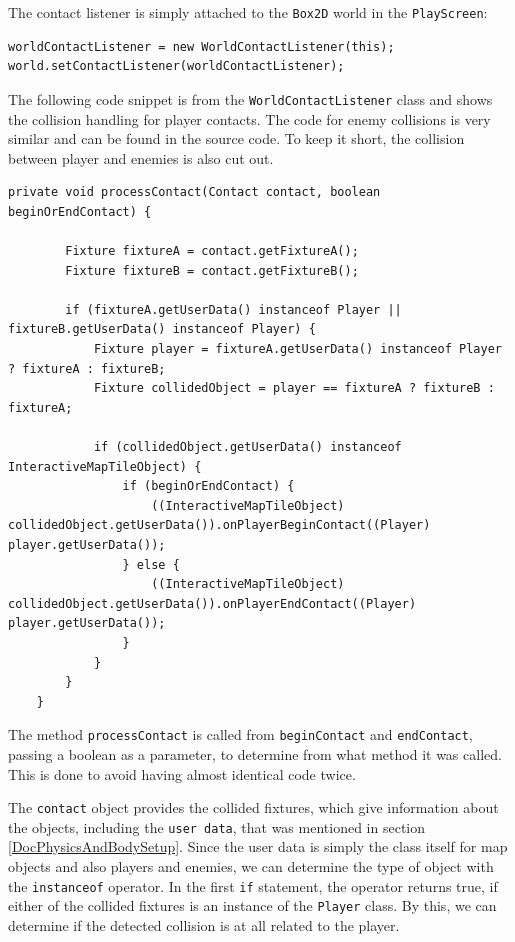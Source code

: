 \documentclass[12p]{article}
\begin{document}
The contact listener is simply attached to the \texttt{Box2D} world in the \texttt{PlayScreen}:

\begin{verbatim}
worldContactListener = new WorldContactListener(this);
world.setContactListener(worldContactListener);
\end{verbatim}

The following code snippet is from the \texttt{WorldContactListener} class and shows the collision handling for player contacts. The code for enemy collisions is very similar and can be found in the source code. To keep it short, the collision between player and enemies is also cut out.

\begin{verbatim}
private void processContact(Contact contact, boolean beginOrEndContact) {

        Fixture fixtureA = contact.getFixtureA();
        Fixture fixtureB = contact.getFixtureB();

        if (fixtureA.getUserData() instanceof Player || fixtureB.getUserData() instanceof Player) {
            Fixture player = fixtureA.getUserData() instanceof Player ? fixtureA : fixtureB;
            Fixture collidedObject = player == fixtureA ? fixtureB : fixtureA;

            if (collidedObject.getUserData() instanceof InteractiveMapTileObject) {
                if (beginOrEndContact) {
                    ((InteractiveMapTileObject) collidedObject.getUserData()).onPlayerBeginContact((Player) player.getUserData());
                } else {
                    ((InteractiveMapTileObject) collidedObject.getUserData()).onPlayerEndContact((Player) player.getUserData());
                }
            }
        }
    }
\end{verbatim}

The method \texttt{processContact} is called from \texttt{beginContact} and \texttt{endContact}, passing a boolean as a parameter, to determine from what method it was called. This is done to avoid having almost identical code twice.

The \texttt{contact} object provides the collided fixtures, which give information about the objects, including the \texttt{user data}, that was mentioned in section \ref{DocPhysicsAndBodySetup}. Since the user data is simply the class itself for map objects and also players and enemies, we can determine the type of object with the \texttt{instanceof} operator. In the first \texttt{if} statement, the operator returns true, if either of the collided fixtures is an instance of the \texttt{Player} class. By this, we can determine if the detected collision is at all related to the player.
\end{document}
